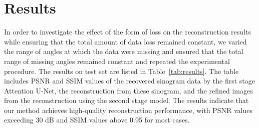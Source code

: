 \documentclass[aps,prb,preprint,groupedaddress,showkeys]{revtex4}
\begin{document}




\section{Results}
\label{chap:results}
In order to investigate the effect of the form of loss on the reconstruction results while ensuring that the total amount of data loss remained constant, we varied the range of angles at which the data were missing and ensured that the total range of missing angles remained constant and repeated the experimental procedure. The results on test set are listed in Table~\ref{tab:results}. 
The table includes PSNR and SSIM values of the recovered sinogram data by the first stage Attention U-Net, the reconstruction from these sinogram, and the refined images from the reconstruction using the second stage model. The results indicate that our method achieves high-quality reconstruction performance, with PSNR values exceeding 30 dB and SSIM values above 0.95 for most cases. 
\end{document}
